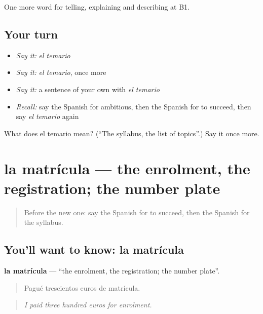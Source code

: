 \begin{grammarlens}[title={What you've built}]
One more word for telling, explaining and describing at B1.
\end{grammarlens}

\subsection*{Your turn}
\begin{itemize}
\raggedright
  \item \emph{Say it:} \emph{el temario}
  \item \emph{Say it:} \emph{el temario}, once more
  \item \emph{Say it:} a sentence of your own with \emph{el temario}
  \item \emph{Recall:} say the Spanish for ambitious, then the Spanish for to succeed, then say \emph{el temario} again
\end{itemize}

\begin{tcolorbox}[breakable,colback=teal!4,colframe=teal!35!black,title={Before you move on}]
What does el temario mean? (\textquotedblleft{}The syllabus, the list of topics\textquotedblright{}.) Say it once more.
\end{tcolorbox}
\section[la matrícula]{la matrícula — the enrolment, the registration; the number plate}

\label{lesson:ES-C596-matricula}



\begin{quote}
Before the new one: say the Spanish for to succeed, then the Spanish for the syllabus.
\end{quote}

\subsection*{You'll want to know: la matrícula}
\textbf{la matrícula} — \textquotedblleft{}the enrolment, the registration; the number plate\textquotedblright{}.

\begin{quote}
Pagué trescientos euros de matrícula.
\end{quote}

\begin{quote}
\emph{I paid three hundred euros for enrolment.}
\end{quote}

